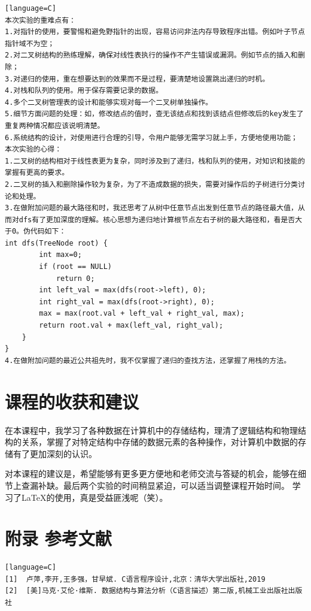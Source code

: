 \documentclass[supercite]{Experimental_Report}
\theoremstyle{definition}
\begin{document}
\begin{sloppypar}
\begin{lstlisting}[breaklines][language=C]
本次实验的重难点有：
1.对指针的使用，要警惕和避免野指针的出现，容易访问非法内存导致程序出错。例如叶子节点指针域不为空；
2.对二叉树结构的熟练理解，确保对线性表执行的操作不产生错误或漏洞。例如节点的插入和删除；
3.对递归的使用，重在想要达到的效果而不是过程，要清楚地设置跳出递归的时机。
4.对栈和队列的使用。用于保存需要记录的数据。
4.多个二叉树管理表的设计和能够实现对每一个二叉树单独操作。
5.细节方面问题的处理：如，修改结点的值时，查无该结点和找到该结点但修改后的key发生了重复两种情况都应该说明清楚。
6.系统结构的设计，对使用进行合理的引导，令用户能够无需学习就上手，方便地使用功能；
本次实验的心得：
1.二叉树的结构相对于线性表更为复杂，同时涉及到了递归，栈和队列的使用，对知识和技能的掌握有更高的要求。
2.二叉树的插入和删除操作较为复杂，为了不造成数据的损失，需要对操作后的子树进行分类讨论和处理。
3.在做附加问题的最大路径和时，我还思考了从树中任意节点出发到任意节点的路径最大值，从而对dfs有了更加深度的理解。核心思想为递归地计算根节点左右子树的最大路径和，看是否大于0。伪代码如下：
int dfs(TreeNode root) {
        int max=0;
        if (root == NULL)
            return 0;
        int left_val = max(dfs(root->left), 0);
        int right_val = max(dfs(root->right), 0);
        max = max(root.val + left_val + right_val, max);
        return root.val + max(left_val, right_val);
    }
}
4.在做附加问题的最近公共祖先时，我不仅掌握了递归的查找方法，还掌握了用栈的方法。

\end{lstlisting}

\section{课程的收获和建议}

在本课程中，我学习了各种数据在计算机中的存储结构，理清了逻辑结构和物理结构的关系，掌握了对特定结构中存储的数据元素的各种操作，对计算机中数据的存储有了更加深刻的认识。

对本课程的建议是，希望能够有更多更方便地和老师交流与答疑的机会，能够在细节上查漏补缺。最后两个实验的时间稍显紧迫，可以适当调整课程开始时间。
学习了LaTeX的使用，真是受益匪浅呢（笑）。
\appendix
\section{附录 参考文献}
\begin{lstlisting}[breaklines][language=C]
[1]  卢萍,李开,王多强，甘早斌. C语言程序设计,北京：清华大学出版社,2019
[2]  [美]马克·艾伦·维斯. 数据结构与算法分析（C语言描述）第二版,机械工业出版社出版社
\end{lstlisting}



\end{sloppypar}
\end{document}
